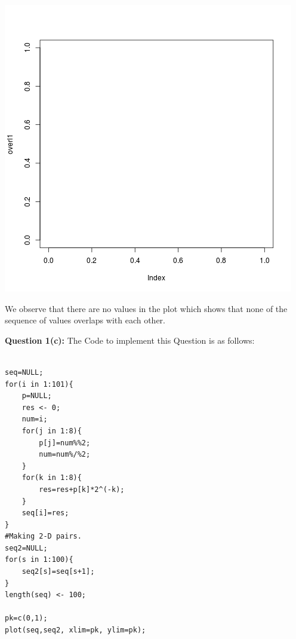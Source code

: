 \documentclass{article}
\begin{document}
\begin{center}
	\includegraphics{Question1_2.png}
\end{center}

We observe that there are no values in the plot which shows that none of the sequence of values overlaps with each other.\\

\newpage

\textbf{\large Question 1(c):}
The Code to implement this Question is as follows:\\


\lstset {language=R}


\begin{lstlisting}

seq=NULL;
for(i in 1:101){
	p=NULL;
	res <- 0;
	num=i;
	for(j in 1:8){
		p[j]=num%%2;
		num=num%/%2;
	}
	for(k in 1:8){
		res=res+p[k]*2^(-k);
	}
	seq[i]=res;
}
#Making 2-D pairs.
seq2=NULL;
for(s in 1:100){
	seq2[s]=seq[s+1];
}
length(seq) <- 100;

pk=c(0,1);
plot(seq,seq2, xlim=pk, ylim=pk);


\end{lstlisting}
\end{document}
